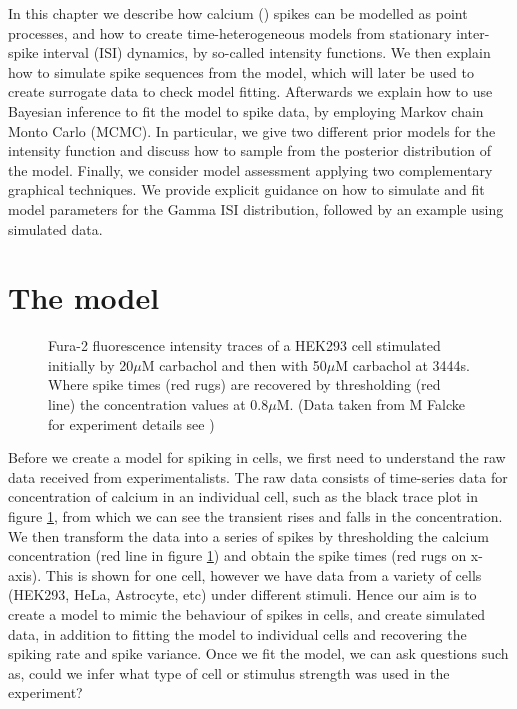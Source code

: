 \documentclass[../main.tex]{subfiles}
\begin{document}
In this chapter we describe how calcium () spikes can be modelled as point processes, and how to create time-heterogeneous models from stationary inter-spike interval (ISI) dynamics, by so-called intensity functions. We then explain how to simulate spike sequences from the model, which will later be used to create surrogate data to check model fitting. Afterwards we explain how to use Bayesian inference to fit the model to spike data, by employing Markov chain Monto Carlo (MCMC). In particular, we give two different prior models for the intensity function and discuss how to sample from the posterior distribution of the model. Finally, we consider model assessment applying two complementary graphical techniques. We provide explicit guidance on how to simulate and fit model parameters for the Gamma ISI distribution, followed by an example using simulated data.

\section{The model}

  \begin{figure}[t]
   \hrulefill
   \begin{center} 
 
    \end{center}     
    \caption{Fura-2 fluorescence intensity traces of a HEK293 cell stimulated initially by 20$\mu$M carbachol and then with 50$\mu$M carbachol at 3444s. Where spike times (red rugs) are recovered by thresholding (red line) the concentration values at 0.8$\mu$M. (Data taken from M Falcke for experiment details see \cite{Thurley_2014} )  }
     \label{fig:trace}
    \hrulefill
    \end{figure}
    
Before we create a model for  spiking in cells, we first need to understand the raw data received from experimentalists. The raw data consists of time-series data for concentration of calcium in an individual cell, such as the black trace plot in figure \ref{fig:trace}, from which we can see the transient rises and falls in the  concentration. We then transform the data into a series of spikes by thresholding  the calcium concentration (red line in figure \ref{fig:trace}) and obtain the spike times (red rugs on x-axis). This is shown for one cell, however we have data from a variety of cells (HEK293, HeLa, Astrocyte, etc) under different stimuli. Hence our aim is to create a model to mimic the behaviour of  spikes in cells, and create simulated data, in addition to fitting the model to individual cells and recovering the spiking rate and spike variance. Once we fit the model, we can ask questions such as, could we infer what type of cell or stimulus strength was used in the experiment? 
    
\end{document}

